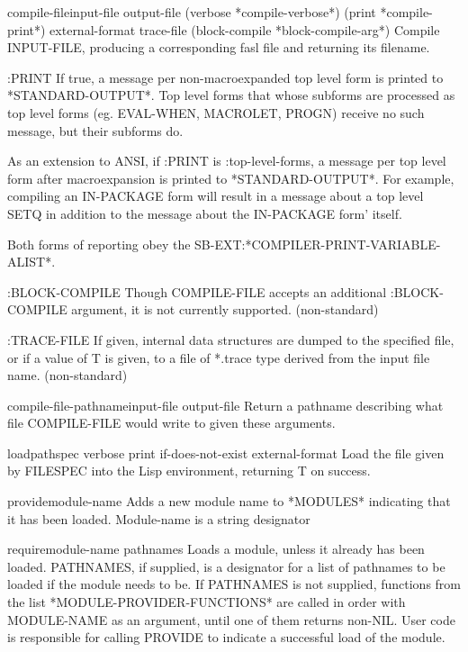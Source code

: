 \begin{function}{compile-file}{input-file \key output-file (verbose *compile-verbose*)
 (print *compile-print*) external-format trace-file
 (block-compile *block-compile-arg*)}{}{}
  Compile INPUT-FILE, producing a corresponding fasl file and
returning its filename.

  :PRINT
     If true, a message per non-macroexpanded top level form is printed
     to *STANDARD-OUTPUT*. Top level forms that whose subforms are
     processed as top level forms (eg. EVAL-WHEN, MACROLET, PROGN) receive
     no such message, but their subforms do.

     As an extension to ANSI, if :PRINT is :top-level-forms, a message
     per top level form after macroexpansion is printed to *STANDARD-OUTPUT*.
     For example, compiling an IN-PACKAGE form will result in a message about
     a top level SETQ in addition to the message about the IN-PACKAGE form'
     itself.

     Both forms of reporting obey the SB-EXT:*COMPILER-PRINT-VARIABLE-ALIST*.

  :BLOCK-COMPILE
     Though COMPILE-FILE accepts an additional :BLOCK-COMPILE
     argument, it is not currently supported. (non-standard)

  :TRACE-FILE
     If given, internal data structures are dumped to the specified
     file, or if a value of T is given, to a file of *.trace type
     derived from the input file name. (non-standard)
\end{function}

\begin{function}{compile-file-pathname}{input-file \key output-file \akeys}{}{}
  Return a pathname describing what file COMPILE-FILE would write to given
   these arguments.
\end{function}

\begin{function}{load}{pathspec \key verbose print if-does-not-exist external-format}{}{}
  Load the file given by FILESPEC into the Lisp environment, returning
   T on success.
\end{function}

\begin{function}{provide}{module-name}{}{}
  Adds a new module name to *MODULES* indicating that it has been loaded.
   Module-name is a string designator
\end{function}

\begin{function}{require}{module-name \op pathnames}{}{}
  Loads a module, unless it already has been loaded. PATHNAMES, if supplied,
   is a designator for a list of pathnames to be loaded if the module
   needs to be. If PATHNAMES is not supplied, functions from the list
   *MODULE-PROVIDER-FUNCTIONS* are called in order with MODULE-NAME
   as an argument, until one of them returns non-NIL.  User code is
   responsible for calling PROVIDE to indicate a successful load of the
   module.
\end{function}

